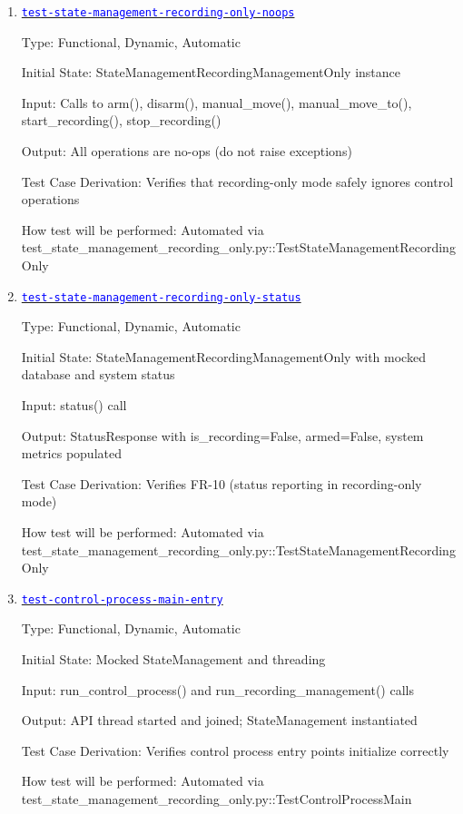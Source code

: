\documentclass[12pt, titlepage]{article}
\newcommand{\tid}[1]{\hyperlink{tid:#1}{\textcolor{blue}{\texttt{#1}}}}
\begin{document}
\begin{enumerate}

  \item{\tid{test-state-management-recording-only-noops}\\}

        Type: Functional, Dynamic, Automatic

        Initial State: StateManagementRecordingManagementOnly instance

        Input: Calls to arm(), disarm(), manual\_move(), manual\_move\_to(),
        start\_recording(), stop\_recording()

        Output: All operations are no-ops (do not raise exceptions)

        Test Case Derivation: Verifies that recording-only mode safely ignores control
        operations

        How test will be performed: Automated via
        test\_state\_management\_recording\_only.py::TestStateManagementRecordingOnly

  \item{\tid{test-state-management-recording-only-status}\\}

        Type: Functional, Dynamic, Automatic

        Initial State: StateManagementRecordingManagementOnly with mocked database and
        system status

        Input: status() call

        Output: StatusResponse with is\_recording=False, armed=False, system metrics
        populated

        Test Case Derivation: Verifies FR-10 (status reporting in recording-only mode)

        How test will be performed: Automated via
        test\_state\_management\_recording\_only.py::TestStateManagementRecordingOnly

  \item{\tid{test-control-process-main-entry}\\}

        Type: Functional, Dynamic, Automatic

        Initial State: Mocked StateManagement and threading

        Input: run\_control\_process() and run\_recording\_management() calls

        Output: API thread started and joined; StateManagement instantiated

        Test Case Derivation: Verifies control process entry points initialize
        correctly

        How test will be performed: Automated via
        test\_state\_management\_recording\_only.py::TestControlProcessMain

\end{enumerate}
\end{document}
